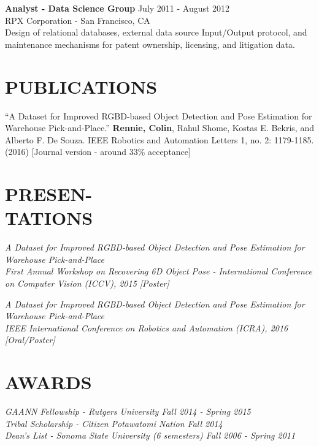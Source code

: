 \documentclass[margin, 10pt]{res} %
\begin{document}
\begin{resume}
{\bf Analyst - Data Science Group} \hfill July 2011 - August 2012 \\
RPX Corporation - San Francisco, CA\\
Design of relational databases, external data source Input/Output protocol, and maintenance mechanisms for patent ownership, licensing, and litigation data.


\section{PUBLICATIONS} 

``A Dataset for Improved RGBD-based Object Detection and Pose Estimation for Warehouse Pick-and-Place.''
\textbf{Rennie, Colin}, Rahul Shome, Kostas E. Bekris, and Alberto F. De Souza. IEEE Robotics and Automation Letters 1, no. 2: 1179-1185. (2016) [Journal version - around 33\% acceptance]


\section{PRESEN-\\TATIONS} 

\sl{A Dataset for Improved RGBD-based Object Detection and Pose Estimation for Warehouse Pick-and-Place}\\
First Annual Workshop on Recovering 6D Object Pose - International Conference on Computer Vision (ICCV), 2015 [Poster]

\sl{A Dataset for Improved RGBD-based Object Detection and Pose Estimation for Warehouse Pick-and-Place}\\
IEEE International Conference on Robotics and Automation (ICRA), 2016 [Oral/Poster]


\section{AWARDS} 

\sl{GAANN Fellowship - Rutgers University} \hfill Fall 2014 - Spring 2015\\
\sl{Tribal Scholarship - Citizen Potawatomi Nation} \hfill Fall 2014\\
\sl{Dean's List - Sonoma State University (6 semesters)} \hfill Fall 2006 - Spring 2011\\



\end{resume}
\end{document}
